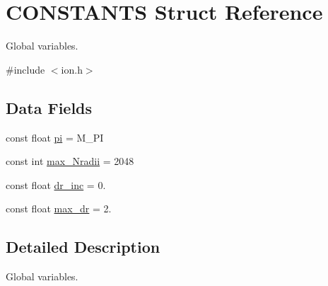 \hypertarget{struct_c_o_n_s_t_a_n_t_s}{\section{C\+O\+N\+S\+T\+A\+N\+T\+S Struct Reference}
\label{struct_c_o_n_s_t_a_n_t_s}
}


Global variables.  




{\ttfamily \#include $<$ion.\+h$>$}

\subsection*{Data Fields}
\begin{DoxyCompactItemize}
\item 
const float \hyperlink{struct_c_o_n_s_t_a_n_t_s_abce8f0db8a5282e441988c8d2e73f79e}{pi} = M\+\_\+\+P\+I
\item 
const int \hyperlink{struct_c_o_n_s_t_a_n_t_s_afe3adcf3ff974c278558c412f9ba9aaa}{max\+\_\+\+Nradii} = 2048
\item 
const float \hyperlink{struct_c_o_n_s_t_a_n_t_s_aee74bf2783f87d610cfb7a42933cb3a3}{dr\+\_\+inc} = 0.
\item 
const float \hyperlink{struct_c_o_n_s_t_a_n_t_s_a5ddc9828f90dc883b9baf3dfab1cd3e6}{max\+\_\+dr} = 2.
\end{DoxyCompactItemize}


\subsection{Detailed Description}
Global variables. 

